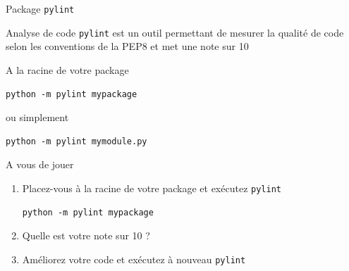\documentclass[10pt]{beamer}
\begin{document}
\begin{frame}[fragile]{Package \texttt{pylint}}
  \begin{block}{Analyse de code}
    \medskip
    \texttt{pylint} est un outil permettant de mesurer la qualité de code selon les conventions de la PEP8 et met une note sur 10
  \end{block}

  A la racine de votre package
\begin{lstlisting}[numbers=none]
python -m pylint mypackage
\end{lstlisting}

  ou simplement
\begin{lstlisting}[numbers=none]
python -m pylint mymodule.py
\end{lstlisting}
    
\end{frame}

\begin{frame}[fragile]{A vous de jouer}

  \begin{enumerate}
    \item Placez-vous à la racine de votre package et exécutez \texttt{pylint}
\begin{lstlisting}[numbers=none]
python -m pylint mypackage
\end{lstlisting}
    \item Quelle est votre note sur 10 ?
    \item Améliorez votre code et exécutez à nouveau \texttt{pylint}
  \end{enumerate}
  
\end{frame}
\end{document}
